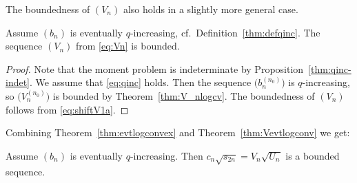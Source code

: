 The boundedness of $(V_n)$ also holds in a slightly more general case.

\begin{thm}\label{thm:Vevtlogconv} Assume $(b_n)$ is eventually $q$-increasing, cf.\ Definition~{\rm \ref{thm:defqinc}}. The sequence $(V_n)$ from \eqref{eq:Vn} is bounded.
\end{thm}

\begin{proof} Note that the moment problem is indeterminate by Proposition~\ref{thm:qinc-indet}. We assume that \eqref{eq:qinc} holds. Then the sequence $\big(b_n^{(n_0)}\big)$ is $q$-increasing, so $\big(V_n^{(n_0)}\big)$ is bounded by Theorem~\ref{thm:V_nlogcv}. The boundedness of $(V_n)$ follows from \eqref{eq:shiftV1a}.
\end{proof}

Combining Theorem~\ref{thm:evtlogconvex} and Theorem~\ref{thm:Vevtlogconv} we get:

\begin{cor}\label{thm:VnsqrtUn} Assume $(b_n)$ is eventually $q$-increasing. Then $c_n\sqrt{s_{2n}}=V_n\sqrt{U_n}$ is a bounded sequence.
\end{cor}
